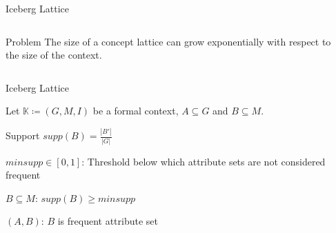 \begin{frame}{Iceberg Lattice~\parencite{titanic_2002}}
    \label{foundations:titanic}
\begin{columns}
\begin{column}{0.7\textwidth}
\begin{alertblock}{Problem} %
The size of a concept lattice can grow exponentially with respect to the size of the context.
\end{alertblock}

\end{column}

\begin{column}{0.25\textwidth}





\end{column}
\end{columns}
\end{frame}


\begin{frame}{Iceberg Lattice~\parencite{titanic_2002}}

Let $\mathbb{K} \coloneq (G, M, I)$ be a formal context, $A \subseteq G$ and $B \subseteq M$.
\begin{definition}
Support $supp(B) = \frac{\left| B' \right|}{\left| G \right|}$
\end{definition}


\begin{description}
    \item<2->[minimum support] $minsupp \in [0,1]$: Threshold below which attribute sets are not considered frequent
    \item <3-> [frequent attribute set] $B \subseteq M$: $supp(B) \ge minsupp$  %
    \item <4-> [frequent concept] $(A, B)$: $B$ is frequent attribute set
\end{description}

    



\end{frame}

